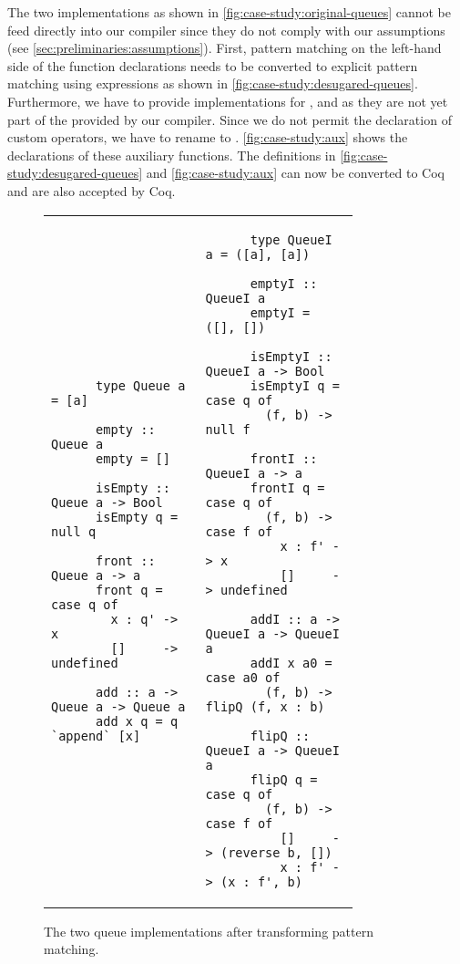 The two implementations as shown in \autoref{fig:case-study:original-queues} cannot be feed directly into our compiler since they do not comply with our assumptions (see \autoref{sec:preliminaries:assumptions}).
First, pattern matching on the left-hand side of the function declarations needs to be converted to explicit pattern matching using  expressions as shown in \autoref{fig:case-study:desugared-queues}.
Furthermore, we have to provide implementations for , \haskell{(++)} and  as they are not yet part of the  provided by our compiler.
Since we do not permit the declaration of custom operators, we have to rename \haskell{(++)} to .
\autoref{fig:case-study:aux} shows the declarations of these auxiliary functions.
The definitions in \autoref{fig:case-study:desugared-queues} and \autoref{fig:case-study:aux} can now be converted to Coq and are also accepted by Coq.

\begin{figure}[H]
  \begin{tabular}{p{0.40\linewidth} | p{0.40\linewidth}}
    \begin{verbatim}
      type Queue a = [a]

      empty :: Queue a
      empty = []

      isEmpty :: Queue a -> Bool
      isEmpty q = null q

      front :: Queue a -> a
      front q = case q of
        x : q' -> x
        []     -> undefined

      add :: a -> Queue a -> Queue a
      add x q = q `append` [x]
    \end{verbatim}
    &
    \begin{verbatim}
      type QueueI a = ([a], [a])

      emptyI :: QueueI a
      emptyI = ([], [])

      isEmptyI :: QueueI a -> Bool
      isEmptyI q = case q of
        (f, b) -> null f

      frontI :: QueueI a -> a
      frontI q = case q of
        (f, b) -> case f of
          x : f' -> x
          []     -> undefined

      addI :: a -> QueueI a -> QueueI a
      addI x a0 = case a0 of
        (f, b) -> flipQ (f, x : b)

      flipQ :: QueueI a -> QueueI a
      flipQ q = case q of
        (f, b) -> case f of
          []     -> (reverse b, [])
          x : f' -> (x : f', b)
    \end{verbatim}
  \end{tabular}
  \caption{
    The two queue implementations after transforming pattern matching.
  }
  \label{fig:case-study:desugared-queues}
\end{figure}


